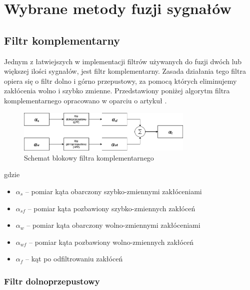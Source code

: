\chapter{Wybrane metody fuzji sygnałów}
\label{chap:wybrane}

\section{Filtr komplementarny}

Jednym z łatwiejszych w implementacji filtrów używanych do fuzji dwóch lub większej ilości sygnałów, jest filtr komplementarny. Zasada działania tego filtra opiera się o filtr dolno i górno przepustowy, za pomocą których eliminujemy zakłócenia wolno i szybko zmienne. Przedstawiony poniżej algorytm filtra komplementarnego opracowano w oparciu o artykuł \cite{Komplementarny2}.

\begin{figure}[h!]
    \centering
    \includegraphics[width=0.75\textwidth]{Rysunki/Rozdzial04/Filtr_komplementarny.png}
    \caption{Schemat blokowy filtra komplementarnego}
    \label{filtr komplementarny}
\end{figure}
%
gdzie
\begin{itemize}
    \item $\alpha_s$ -- pomiar kąta obarczony szybko-zmiennymi zakłóceniami
    \item $\alpha_{sf}$ -- pomiar kąta pozbawiony szybko-zmiennych zakłóceń
    \item $\alpha_w$ -- pomiar kąta obarczony wolno-zmiennymi zakłóceniami
    \item $\alpha_{wf}$ -- pomiar kąta pozbawiony wolno-zmiennych zakłóceń
    \item $\alpha_f$ -- kąt po odfiltrowaniu zakłóceń
\end{itemize}

\subsection{Filtr dolnoprzepustowy}

